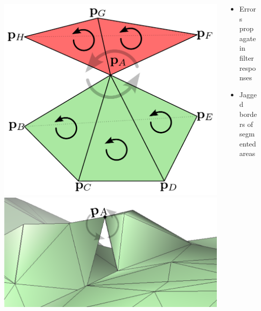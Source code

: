 \documentclass[aspectratio=169,t]{beamer}
\begin{document}
{\begin{columns}[T]
\begin{column}{.45\textwidth}
\begin{columns}[T]
\begin{column}{.45\textwidth}
					\includegraphics[width=\textwidth]{figures/badMesh1.png}
					\includegraphics[width=\textwidth]{figures/badMesh2.png}
				\end{column}
			\end{columns}
		\end{column}
		\begin{column}{.475\textwidth}
			\begin{itemize}
				\item Errors propagate in filter responses
				\item Jagged borders of segmented areas
			\end{itemize}
			\vspace*{4mm}
			\begin{columns}[T]
				\begin{column}{.1\textwidth}

\end{column}
\end{columns}
\end{column}
\end{columns}}
\end{document}
